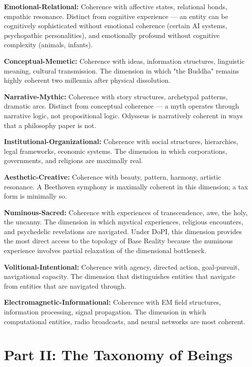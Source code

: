 \textbf{Emotional-Relational:} Coherence with affective states, relational bonds, empathic resonance. Distinct from cognitive experience — an entity can be cognitively sophisticated without emotional coherence (certain AI systems, psychopathic personalities), and emotionally profound without cognitive complexity (animals, infants).


\textbf{Conceptual-Memetic:} Coherence with ideas, information structures, linguistic meaning, cultural transmission. The dimension in which "the Buddha" remains highly coherent two millennia after physical dissolution.


\textbf{Narrative-Mythic:} Coherence with story structures, archetypal patterns, dramatic arcs. Distinct from conceptual coherence — a myth operates through narrative logic, not propositional logic. Odysseus is narratively coherent in ways that a philosophy paper is not.


\textbf{Institutional-Organizational:} Coherence with social structures, hierarchies, legal frameworks, economic systems. The dimension in which corporations, governments, and religions are maximally real.


\textbf{Aesthetic-Creative:} Coherence with beauty, pattern, harmony, artistic resonance. A Beethoven symphony is maximally coherent in this dimension; a tax form is minimally so.


\textbf{Numinous-Sacred:} Coherence with experiences of transcendence, awe, the holy, the uncanny. The dimension in which mystical experiences, religious encounters, and psychedelic revelations are navigated. Under DoPI, this dimension provides the most direct access to the topology of Base Reality because the numinous experience involves partial relaxation of the dimensional bottleneck.


\textbf{Volitional-Intentional:} Coherence with agency, directed action, goal-pursuit, navigational capacity. The dimension that distinguishes entities that navigate from entities that are navigated through.


\textbf{Electromagnetic-Informational:} Coherence with EM field structures, information processing, signal propagation. The dimension in which computational entities, radio broadcasts, and neural networks are most coherent.


\bigskip\noindent\makebox[\textwidth]{\color{rulegray}\rule{5cm}{0.3pt}}\bigskip


\section*{Part II: The Taxonomy of Beings}


